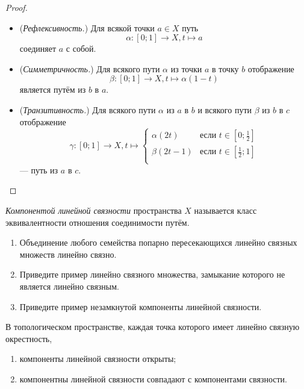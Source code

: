\documentclass[12pt,a4paper]{article}
\begin{document}
    \begin{proof}
        \begin{itemize}
            \item (\emph{Рефлексивность.}) Для всякой точки $a \in X$ путь \[\alpha: [0; 1] \to X, t \mapsto a\] соединяет $a$ с собой.
            \item (\emph{Симметричность.}) Для всякого пути $\alpha$ из точки $a$ в точку $b$ отображение \[\beta: [0; 1] \to X, t \mapsto \alpha(1 - t)\] является путём из $b$ в $a$.
            \item (\emph{Транзитивность.}) Для всякого пути $\alpha$ из $a$ в $b$ и всякого пути $\beta$ из $b$ в $c$ отображение
                \[\gamma: [0; 1] \to X, t \mapsto
                    \begin{cases}
                        \alpha(2t)& \text{если $t \in [0; \frac{1}{2}]$}\\
                        \beta(2t-1)& \text{если $t \in [\frac{1}{2}; 1]$}\\
                    \end{cases}
                \]
                --- путь из $a$ в $c$.
        \end{itemize}
    \end{proof}

    \begin{definition}
        \emph{Компонентой линейной связности} пространства $X$ называется класс эквивалентности отношения соединимости путём.
    \end{definition}

    \begin{exercise}
        \begin{enumerate}
            \item Объединение любого семейства попарно пересекающихся линейно связных множеств линейно связно.
            \item Приведите пример линейно связного множества, замыкание которого не является линейно связным.
            \item Приведите пример незамкнутой компоненты линейной связности.
        \end{enumerate}
    \end{exercise}

    \begin{theorem}
        В топологическом пространстве, каждая точка которого имеет линейно связную окрестность,
        \begin{enumerate}
            \item компоненты линейной связности открыты;
            \item компонентны линейной связности совпадают с компонентами связности.
        \end{enumerate}
    \end{theorem}
\end{document}
